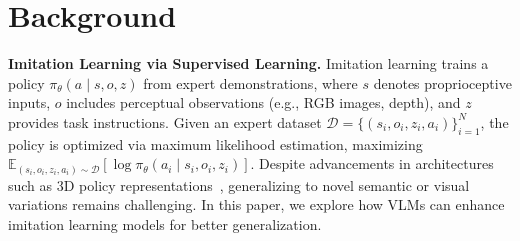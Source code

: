 \section{Background}
\label{sec:prelim}



\textbf{Imitation Learning via Supervised Learning.}  
Imitation learning trains a policy $\pi_\theta(a \mid s, o, z)$ from expert demonstrations, where $s$ denotes proprioceptive inputs, $o$ includes perceptual observations (e.g., RGB images, depth), and $z$ provides task instructions. Given an expert dataset $\mathcal{D} = \{(s_i, o_i, z_i, a_i)\}_{i=1}^N$, the policy is optimized via maximum likelihood estimation, maximizing $\mathbb{E}_{(s_i, o_i, z_i, a_i) \sim \mathcal{D}} \left[ \log \pi_\theta\left(a_i \mid s_i, o_i, z_i \right) \right]$. Despite advancements in architectures such as 3D policy representations~\citep{goyal2023rvt, ke20243d}, generalizing to novel semantic or visual variations remains challenging. In this paper, we explore how VLMs can enhance imitation learning models for better generalization.

